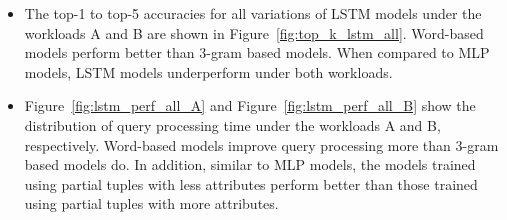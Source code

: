 \begin{itemize}
	\item The top-1 to top-5 accuracies for all variations of LSTM models under the workloads A and B are shown in Figure~\ref{fig:top_k_lstm_all}. 
	Word-based models perform better than 3-gram based models. When compared to MLP models, LSTM models underperform under both workloads.
	\item Figure~\ref{fig:lstm_perf_all_A} and Figure~\ref{fig:lstm_perf_all_B} show the distribution of query processing time under the workloads A and B, respectively. 
	Word-based models improve query processing more than 3-gram based models do. 
	In addition, similar to MLP models, the models trained using partial tuples with less attributes perform better than those trained using partial tuples with more attributes.
\end{itemize}
